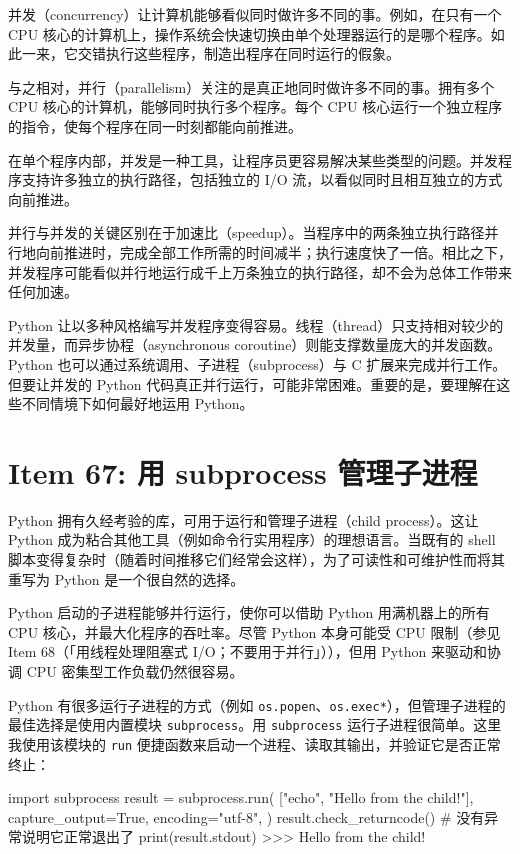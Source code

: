 并发（concurrency）让计算机能够看似同时做许多不同的事。例如，在只有一个 CPU 核心的计算机上，操作系统会快速切换由单个处理器运行的是哪个程序。如此一来，它交错执行这些程序，制造出程序在同时运行的假象。

与之相对，并行（parallelism）关注的是真正地同时做许多不同的事。拥有多个 CPU 核心的计算机，能够同时执行多个程序。每个 CPU 核心运行一个独立程序的指令，使每个程序在同一时刻都能向前推进。

在单个程序内部，并发是一种工具，让程序员更容易解决某些类型的问题。并发程序支持许多独立的执行路径，包括独立的 I/O 流，以看似同时且相互独立的方式向前推进。

并行与并发的关键区别在于加速比（speedup）。当程序中的两条独立执行路径并行地向前推进时，完成全部工作所需的时间减半；执行速度快了一倍。相比之下，并发程序可能看似并行地运行成千上万条独立的执行路径，却不会为总体工作带来任何加速。

Python 让以多种风格编写并发程序变得容易。线程（thread）只支持相对较少的并发量，而异步协程（asynchronous coroutine）则能支撑数量庞大的并发函数。Python 也可以通过系统调用、子进程（subprocess）与 C 扩展来完成并行工作。但要让并发的 Python 代码真正并行运行，可能非常困难。重要的是，要理解在这些不同情境下如何最好地运用 Python。

\section{Item 67: 用 subprocess 管理子进程}

Python 拥有久经考验的库，可用于运行和管理子进程（child process）。这让 Python 成为粘合其他工具（例如命令行实用程序）的理想语言。当既有的 shell 脚本变得复杂时（随着时间推移它们经常会这样），为了可读性和可维护性而将其重写为 Python 是一个很自然的选择。

Python 启动的子进程能够并行运行，使你可以借助 Python 用满机器上的所有 CPU 核心，并最大化程序的吞吐率。尽管 Python 本身可能受 CPU 限制（参见 Item 68（「用线程处理阻塞式 I/O；不要用于并行」）），但用 Python 来驱动和协调 CPU 密集型工作负载仍然很容易。

Python 有很多运行子进程的方式（例如 \texttt{os.popen}、\texttt{os.exec*}），但管理子进程的最佳选择是使用内置模块 \texttt{subprocess}。用 \texttt{subprocess} 运行子进程很简单。这里我使用该模块的 \texttt{run} 便捷函数来启动一个进程、读取其输出，并验证它是否正常终止：

\begin{codebox}[python]
import subprocess
result = subprocess.run(
    ["echo", "Hello from the child!"],
    capture_output=True,
    encoding="utf-8",
)
result.check_returncode()  # 没有异常说明它正常退出了
print(result.stdout)
>>>
Hello from the child!
\end{codebox}

